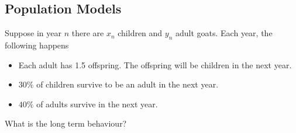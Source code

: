 \documentclass{article}
\begin{document}
    \subsection{Population Models}
    \begin{example}
      Suppose in year $n$ there are $x_n$ children and $y_n$ adult goats. Each year, the following happens
      \begin{itemize}
        \item Each adult has 1.5 offspring. The offspring will be children in the next year.
        \item $30\%$ of children survive to be an adult in the next year.
        \item $40\%$ of adults survive in the next year.
      \end{itemize}
      What is the long term behaviour?


\end{example}
\end{document}

